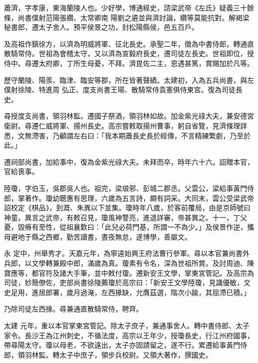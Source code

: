 
\begin{pinyinscope}

 蕭濟，字孝康，東海蘭陵人也。少好學，博通經史，諮梁武帝《左氏》疑義三十餘條，尚書僕射范陽張纘、太常卿南
 陽劉之遴並與濟討論，纘等莫能抗對。解褐梁秘書郎，遷太子舍人。預平侯景之功，封松陽縣侯，邑五百戶。



 及高祖作鎮徐方，以濟為明威將軍、征北長史。承聖二年，徵為中書侍郎，轉通直散騎常侍。世祖為會稽太守，又以濟為宣毅府長史，遷司徒左長史。世祖即位，授侍中。尋遷太府卿，丁所生母憂，不拜。濟毘佐二主，恩遇甚篤，賞賜加於凡等。



 歷守蘭陵、陽羨、臨津、臨安等郡，所在皆著聲績。太建初，入為五兵尚書，與左僕射徐陵、特進周
 弘正、度支尚書王瑒、散騎常侍袁憲俱侍東宮。復為司徒長史。



 尋授度支尚書，領羽林監。遷國子祭酒，領羽林如故。加金紫光祿大夫，兼安德宮衛尉。尋遷仁威將軍、揚州長史。高宗嘗敕取揚州曹事，躬自省覽，見濟條理詳悉，文無滯害，乃顧謂左右曰：「我本期蕭長史長於經傳，不言精練繁劇，乃至於此。」



 遷祠部尚書，加給事中，復為金紫光祿大夫。未拜而卒，時年六十六。詔贈本官，官給喪事。



 陸瓊，字伯玉，吳郡吳人也。祖完，梁琅邪、彭城二郡丞。父雲公，梁給事黃門侍郎，掌著作。瓊幼聰惠有思理，六歲為五言詩，頗有詞采。大同末，雲公受梁武帝詔校定《棋品》，到溉、朱異以下並集。瓊時年八歲，於客前覆局，由是京師號曰神童。異言之武帝，有敕召見，瓊風神警亮，進退詳審，帝甚異之。十一，丁父憂，毀瘠有至性，從祖襄歎曰：「此兒必荷門基，所謂一不為少。」及侯景作逆，攜母避地于縣之西鄉，勤苦讀書，晝夜無怠，遂博學，善屬文。



 永
 定中，州舉秀才。天嘉元年，為寧遠始興王府法曹行參軍。尋以本官兼尚書外兵郎，以文學轉兼殿中郎，滿歲為真。瓊素有令名，深為世祖所賞。及討周迪、陳寶應等，都官符及諸大手筆，並中敕付瓊。遷新安王文學，掌東宮管記。及高宗為司徒，妙簡僚佐，吏部尚書徐陵薦瓊於高宗曰：「新安王文學陸瓊，見識優敏，文史足用，進居郎署，歲月過淹，左西掾缺，允膺茲選，階次小踰，其屈滯已積。」



 乃除司徒左西掾。尋兼通直散騎常侍，聘齊。



 太建
 元年，重以本官掌東宮管記。除太子庶子，兼通事舍人。轉中書侍郎、太子家令。長沙王為江州刺史，不循法度，高宗以王年少，授瓊長史，行江州府國事，帶尋陽太守。瓊以母老，不欲遠出，太子亦固請留之，遂不行。累遷給事黃門侍郎，領羽林監。轉太子中庶子，領步兵校尉。又領大著作，撰國史。




\end{pinyinscope}
